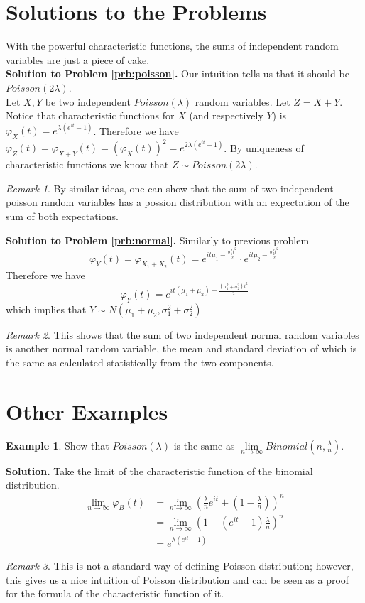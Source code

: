 \documentclass{article}
\theoremstyle{definition}
\newtheorem{example}{Example}[section]
\theoremstyle{plain}
\theoremstyle{remark}
\newtheorem*{remark}{Remark}
\begin{document}
\section{Solutions to the Problems}
With the powerful characteristic functions, the sums of independent random variables are just a piece of cake.\\
\noindent\textbf{Solution to Problem \ref{prb:poisson}.}
Our intuition tells us that it should be $Poisson(2\lambda)$. \\
Let $X,Y$ be two independent $Poisson(\lambda)$ random variables. Let $Z=X+Y$.
Notice that characteristic functions for $X$ (and respectively $Y$) is $\varphi_X(t)=e^{\lambda(e^{it}-1)}$.
Therefore we have $\varphi_Z(t)=\varphi_{X+Y}(t)=(\varphi_X(t))^2=e^{2\lambda(e^{it}-1)}$. 
By uniqueness of characteristic functions we know that $Z\sim Poisson(2\lambda)$.
\begin{remark}
	By similar ideas, one can show that the sum of two independent poisson random variables has a possion distribution with an expectation of the sum of both expectations.
\end{remark} 
\noindent\textbf{Solution to Problem \ref{prb:normal}.}
Similarly to previous problem $$\varphi_{Y}(t)=\varphi_{X_1+X_2}(t)=e^{it\mu_1-\frac{\sigma_1^2 t^2}{2}}\cdot e^{it\mu_2-\frac{\sigma_2^2 t^2}{2}}$$
Therefore we have $$\varphi_Y(t)=e^{it(\mu_1+\mu_2)-\frac{(\sigma_1^2+\sigma_2^2)t^2}{2}}$$
which implies that $Y\sim N(\mu_1+\mu_2,\sigma_1^2+\sigma_2^2)$
\begin{remark}
	This shows that the sum of two independent normal random variables is another normal random variable, the mean and standard deviation of which is the same as calculated statistically from the two components. 
\end{remark}
\section{Other Examples}
\begin{example}
	Show that $Poisson(\lambda)$ is the same as $\lim\limits_{n\to\infty}Binomial(n,\frac{\lambda}{n})$.
\end{example}
\noindent\textbf{Solution.}
Take the limit of the characteristic function of the binomial distribution.
$$\begin{aligned}
\lim\limits_{n\to\infty}\varphi_B(t)&
=\lim\limits_{n\to\infty}(\frac{\lambda}{n}e^{it}+(1-\frac{\lambda}{n}))^n\\
&=\lim\limits_{n\to\infty}(1+(e^{it}-1)\frac{\lambda}{n})^n\\
&=e^{\lambda(e^{it}-1)}
\end{aligned}$$
\begin{remark}
	This is not a standard way of defining Poisson distribution; however, this gives us a nice intuition of Poisson distribution and can be seen as a proof for the formula of the characteristic function of it.
\end{remark}
\end{document}
